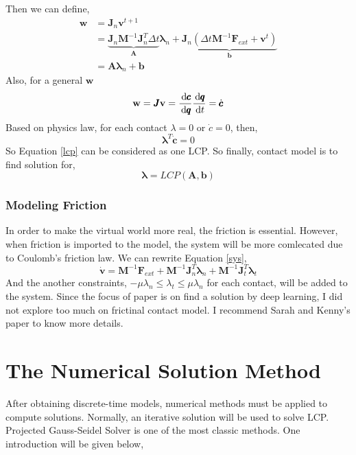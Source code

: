     Then we can define,
    \begin{equation}
    \begin{aligned}
        \mathbf{w} & = \pmb{J}_{n}\mathbf{v}^{t+1} \\
        & =  \underbrace{\pmb{J}_{n}\pmb{M}^{-1}\pmb{J}_{n}^{T}\Delta{t}}_{\pmb{A}}\pmb{\lambda}_{n} + \underbrace{\pmb{J}_{n}(\Delta{t}\pmb{M}^{-1}\mathbf{F}_{ext} + \mathbf{v}^{t})}_{\pmb{b}} \\
        & = \pmb{A}\pmb{\lambda}_{n} + \pmb{b}
    \end{aligned}
    \label{contactlcp}
    \end{equation}
    Also, for a general $\mathbf{w}$
    \begin{equation}
        \mathbf{w} = \pmb{J}\mathbf{v} = \frac{\,\mathrm{d}{\pmb{c}}}{\,\mathrm{d}{\pmb{q}}}\frac{\,\mathrm{d}{\pmb{q}}}{\,\mathrm{d}{t}} = \dot{\pmb{c}}
    \end{equation}
    Based on physics law, for each contact $\lambda = 0$ or $\dot{c} = 0$, then,
    $$\pmb{\lambda}^{T} \dot{\pmb{c}} = 0$$
    So Equation \ref{lcp} can be considered as one LCP. So finally, contact model is to find solution for,
    $$\pmb{\lambda} = \textit{LCP}(\pmb{A}, \pmb{b})$$
    \subsubsection{Modeling Friction}
    In order to make the virtual world more real, the friction is essential. However, when friction is imported to the model, the system will be more comlecated due to Coulomb’s friction law. We can rewrite Equation \ref{sys},
    \begin{equation}
        \dot{\mathbf{v}} = \pmb{M}^{-1}\mathbf{F}_{ext} + \pmb{M}^{-1}\pmb{J}_{n}^{T}\pmb{\lambda}_{n} + \pmb{M}^{-1}\pmb{J}_{t}^{T}\pmb{\lambda}_{t}
    \end{equation}
    And the another constraints, $-\mu \lambda_{n} \le \lambda_t \le \mu \lambda_n$ for each contact, will be added to the system. Since the focus of paper is on find a solution by deep learning, I did not explore too much on frictinal contact model. I recommend Sarah and Kenny's paper \cite{poulsen2010heuristic, bender2014interactive}to know more details. 

\section{The Numerical Solution Method}
    After obtaining discrete-time models, numerical methods must be applied to compute solutions. Normally, an iterative solution will be used to solve LCP. Projected Gauss-Seidel Solver is one of the most classic methods. One introduction will be given below,

